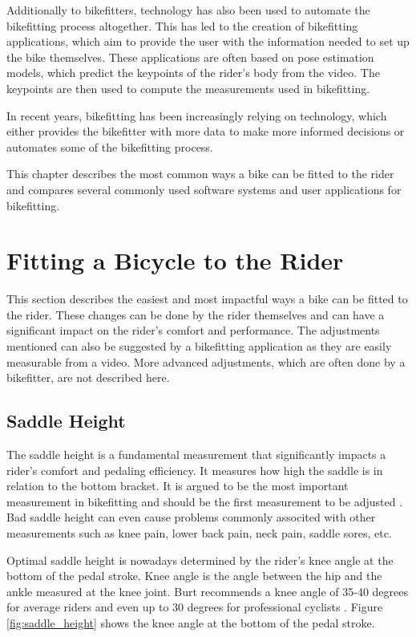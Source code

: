 Additionally to bikefitters, technology has also been used to automate the bikefitting process altogether. This has led to the creation of bikefitting applications, which aim to provide the user with the information needed to set up the bike themselves. These applications are often based on pose estimation models, which predict the keypoints of the rider's body from the video. The keypoints are then used to compute the measurements used in bikefitting.

In recent years, bikefitting has been increasingly relying on technology, which either provides the bikefitter with more data to make more informed decisions or automates some of the bikefitting process.

This chapter describes the most common ways a bike can be fitted to the rider and compares several commonly used software systems and user applications for bikefitting.


\section{Fitting a Bicycle to the Rider}
This section describes the easiest and most impactful ways a bike can be fitted to the rider. These changes can be done by the rider themselves and can have a significant impact on the rider's comfort and performance. The adjustments mentioned can also be suggested by a bikefitting application as they are easily measurable from a video. More advanced adjustments, which are often done by a bikefitter, are not described here.

\subsection{Saddle Height}
The saddle height is a fundamental measurement that significantly impacts a rider's comfort and pedaling efficiency. It measures how high the saddle is in relation to the bottom bracket. It is argued to be the most important measurement in bikefitting and should be the first measurement to be adjusted \cite{burtbikefit}. Bad saddle height can even cause problems commonly associted with other measurements such as knee pain, lower back pain, neck pain, saddle sores, etc.

Optimal saddle height is nowadays determined by the rider's knee angle at the bottom of the pedal stroke. Knee angle is the angle between the hip and the ankle measured at the knee joint. Burt recommends a knee angle of 35-40 degrees for average riders and even up to 30 degrees for professional cyclists \cite{burtbikefit}. Figure \ref{fig:saddle_height} shows the knee angle at the bottom of the pedal stroke.

